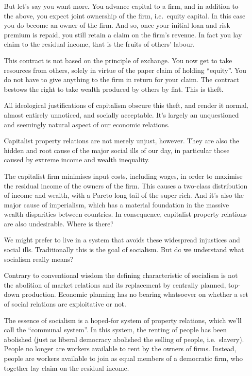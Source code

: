 \documentclass[
]{book}
\begin{document}
But let's say you want more. You advance capital to a firm, and in addition to the above, you expect joint ownership of the firm, i.e.~equity capital. In this case you do become an owner of the firm. And so, once your initial loan and risk premium is repaid, you still retain a claim on the firm's revenue. In fact you lay claim to the residual income, that is the fruits of others' labour.

This contract is not based on the principle of exchange. You now get to take resources from others, solely in virtue of the paper claim of holding ``equity''. You do not have to give anything to the firm in return for your claim. The contract bestows the right to take wealth produced by others by fiat. This is theft.

All ideological justifications of capitalism obscure this theft, and render it normal, almost entirely unnoticed, and socially acceptable. It's largely an unquestioned and seemingly natural aspect of our economic relations.

Capitalist property relations are not merely unjust, however. They are also the hidden and root cause of the major social ills of our day, in particular those caused by extreme income and wealth inequality.

The capitalist firm minimises input costs, including wages, in order to maximise the residual income of the owners of the firm. This causes a two-class distribution of income and wealth, with a Pareto long tail of the super-rich. And it's also the major cause of imperialism, which has a material foundation in the massive wealth disparities between countries. In consequence, capitalist property relations are also undesirable.
Where is there?

We might prefer to live in a system that avoids these widespread injustices and social ills. Traditionally this is the goal of socialism. But do we understand what socialism really means?

Contrary to conventional wisdom the defining characteristic of socialism is not the abolition of market relations and its replacement by centrally planned, top-down production. Economic planning has no bearing whatsoever on whether a set of social relations are exploitative or not.

The essence of socialism is a hoped-for system of property relations, which we'll call the ``communal system''. In this system, the renting of people has been abolished (just as liberal democracy abolished the selling of people, i.e.~slavery). People no longer are workers available to rent by the owners of firms. Instead, people are workers available to join as equal members of a democratic firm, who together lay claim on the residual income.
\end{document}
